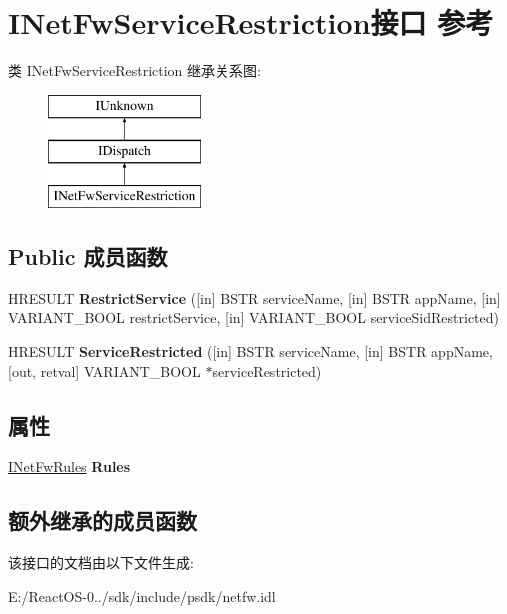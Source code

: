 \hypertarget{interface_i_net_fw_service_restriction}{}\section{I\+Net\+Fw\+Service\+Restriction接口 参考}
\label{interface_i_net_fw_service_restriction}
类 I\+Net\+Fw\+Service\+Restriction 继承关系图\+:\begin{figure}[H]
\begin{center}
\leavevmode
\includegraphics[height=3.000000cm]{interface_i_net_fw_service_restriction}
\end{center}
\end{figure}
\subsection*{Public 成员函数}
\begin{DoxyCompactItemize}
\item 
\mbox{\label{interface_i_net_fw_service_restriction_ac2ba597be8e9ca4c4290e85400566d29}} 
H\+R\+E\+S\+U\+LT {\bfseries Restrict\+Service} (\mbox{[}in\mbox{]} B\+S\+TR service\+Name, \mbox{[}in\mbox{]} B\+S\+TR app\+Name, \mbox{[}in\mbox{]} V\+A\+R\+I\+A\+N\+T\+\_\+\+B\+O\+OL restrict\+Service, \mbox{[}in\mbox{]} V\+A\+R\+I\+A\+N\+T\+\_\+\+B\+O\+OL service\+Sid\+Restricted)
\item 
\mbox{\label{interface_i_net_fw_service_restriction_a814e2b30fbff373678d6d9f96e094375}} 
H\+R\+E\+S\+U\+LT {\bfseries Service\+Restricted} (\mbox{[}in\mbox{]} B\+S\+TR service\+Name, \mbox{[}in\mbox{]} B\+S\+TR app\+Name, \mbox{[}out, retval\mbox{]} V\+A\+R\+I\+A\+N\+T\+\_\+\+B\+O\+OL $\ast$service\+Restricted)
\end{DoxyCompactItemize}
\subsection*{属性}
\begin{DoxyCompactItemize}
\item 
\mbox{\label{interface_i_net_fw_service_restriction_a0170e0f0c201ae346156214fa404d56b}} 
\hyperlink{interface_i_net_fw_rules}{I\+Net\+Fw\+Rules} {\bfseries Rules}
\end{DoxyCompactItemize}
\subsection*{额外继承的成员函数}


该接口的文档由以下文件生成\+:\begin{DoxyCompactItemize}
\item 
E\+:/\+React\+O\+S-\/0../sdk/include/psdk/netfw.\+idl\end{DoxyCompactItemize}
